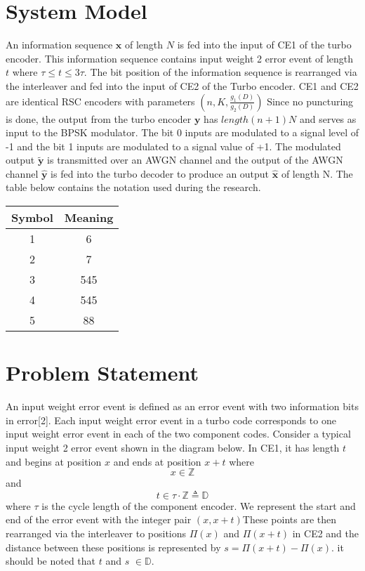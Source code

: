 \documentclass[20 pts]{article}
\begin{document}
\section{System Model}
An information sequence $\mathbf{x}$ of length $N$ is fed into the input of CE1 of the turbo encoder. This information sequence contains input weight 2 error event of length $t$ where $\tau \leq t \leq 3\tau $. The bit position of the information sequence is rearranged via the interleaver and fed into the input of CE2 of the Turbo encoder. CE1 and CE2 are identical RSC encoders with parameters $(n,K, \frac{g_1(D)}{g_2(D)})$  Since no puncturing is done, the output from the turbo encoder $\mathbf{y}$ has $length(n+1)N$ and serves as input to the BPSK modulator. The bit 0 inputs are modulated to a signal level of -1 and the bit 1 inputs are modulated to a signal value of +1. The modulated output $\mathbf{\widetilde{y}}$ is transmitted over an AWGN channel and the output of the AWGN channel $\mathbf{\widehat{y}}$ is fed into the turbo decoder to produce an output $\mathbf{\widehat{x}}$ of length N.
The table below contains the notation used during the research.

\begin{center}
 \begin{tabular}{||c c||} 
 \hline
 Symbol & Meaning \\ [0.5ex] 
 \hline\hline
 1 & 6  \\ 
 \hline
 2 & 7  \\
 \hline
 3 & 545 \\
 \hline
 4 & 545 \\
 \hline
 5 & 88\\ [1ex] 
 \hline
\end{tabular}
\end{center}

\section{Problem Statement}
An input weight error event is defined as an error event with two information bits in error[2]. Each input weight error event in a turbo code corresponds to one input weight error event in each of the two component codes. Consider a typical input weight 2 error event shown in the diagram below. In CE1, it has length $t$ and begins at position $x$ and ends at position $x+t$ where $$x \in \mathbb{Z}$$ and $$t \in \tau \cdot \mathbb{Z} \triangleq \mathbb{D}$$ where $\tau$ is the cycle length of the component encoder. We represent the start and end of the error event with the integer pair $(x,x+t)$These points are then rearranged via the interleaver to positions $\Pi(x)$ and $\Pi(x+t)$ in CE2 and the distance between these positions is represented by $s = \Pi(x+t) - \Pi(x) $. it should be noted that  $t$ and $s$ $ \in \mathbb{D}$.
\end{document}
